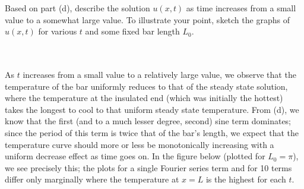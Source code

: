 Based on part (d), describe the solution $u(x, t)$ as time increases from a small value to a somewhat large value.
To illustrate your point, sketch the graphs of $u(x, t)$ for various $t$ and some fixed bar length $L_0$.

\begin{solution}\ \\\\
    As $t$ increases from a small value to a relatively large value, we observe that the temperature of the bar 
    uniformly reduces to that of the steady state solution, where the temperature at the insulated end 
    (which was initially the hottest) takes the longest to cool to that uniform steady state temperature. From (d), we
    know that the first (and to a much lesser degree, second) sine term dominates; since the period of this term is 
    twice that of the bar's length, we expect that the temperature curve should more or less be monotonically increasing
    with a uniform decrease effect as time goes on. In the figure below (plotted for $L_0 = \pi$), we see precisely 
    this; the plots for a single Fourier series term and for 10 terms differ only marginally where the temperature at 
    $x = L$ is the highest for each $t$.    


\end{solution}
